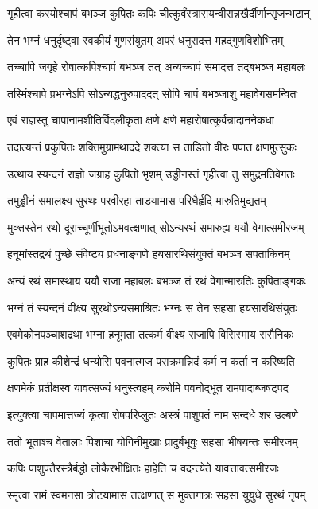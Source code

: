 \twolineshloka
{गृहीत्वा करयोश्चापं बभञ्ज कुपितः कपिः}
{चीत्कुर्वंस्त्रासयन्वीरान्नखैर्दीर्णान्सृजन्भटान्}%

\twolineshloka
{तेन भग्नं धनुर्दृष्ट्वा स्वकीयं गुणसंयुतम्}
{अपरं धनुरादत्त महद्गुणविशोभितम्}%

\twolineshloka
{तच्चापि जगृहे रोषात्कपिश्चापं बभञ्ज तत्}
{अन्यच्चापं समादत्त तद्बभञ्ज महाबलः}%

\twolineshloka
{तस्मिंश्चापे प्रभग्नेऽपि सोऽन्यद्धनुरुपाददत्}
{सोपि चापं बभञ्जाशु महावेगसमन्वितः}%

\twolineshloka
{एवं राज्ञस्तु चापानामशीतिर्विदलीकृता}
{क्षणे क्षणे महारोषात्कुर्वन्नादाननेकधा}%

\twolineshloka
{तदात्यन्तं प्रकुपितः शक्तिमुग्रामथाददे}
{शक्त्या स ताडितो वीरः पपात क्षणमुत्सुकः}%

\twolineshloka
{उत्थाय स्यन्दनं राज्ञो जग्राह कुपितो भृशम्}
{उड्डीनस्तं गृहीत्वा तु समुद्रमतिवेगतः}%

\twolineshloka
{तमुड्डीनं समालक्ष्य सुरथः परवीरहा}
{ताडयामास परिघैर्हृदि मारुतिमुद्यतम्}%

\twolineshloka
{मुक्तस्तेन रथो दूराच्चूर्णीभूतोऽभवत्क्षणात्}
{सोऽन्यरथं समारुह्य ययौ वेगात्समीरजम्}%

\twolineshloka
{हनूमांस्तद्रथं पुच्छे संवेष्ट्य प्रधनाङ्गणे}
{हयसारथिसंयुक्तं बभञ्ज सपताकिनम्}%

\twolineshloka
{अन्यं रथं समास्थाय ययौ राजा महाबलः}
{बभञ्ज तं रथं वेगान्मारुतिः कुपिताङ्गकः}%

\twolineshloka
{भग्नं तं स्यन्दनं वीक्ष्य सुरथोऽन्यसमाश्रितः}
{भग्नः स तेन सहसा हयसारथिसंयुतः}%

\twolineshloka
{एवमेकोनपञ्चाशद्रथा भग्ना हनूमता}
{तत्कर्म वीक्ष्य राजापि विसिस्माय ससैनिकः}%

\twolineshloka
{कुपितः प्राह कीशेन्द्रं धन्योसि पवनात्मज}
{पराक्रमन्निदं कर्म न कर्ता न करिष्यति}%

\twolineshloka
{क्षणमेकं प्रतीक्षस्व यावत्सज्यं धनुस्त्वहम्}
{करोमि पवनोद्भूत रामपादाब्जषट्पद}%

\twolineshloka
{इत्युक्त्वा चापमात्तज्यं कृत्वा रोषपरिप्लुतः}
{अस्त्रं पाशुपतं नाम सन्दधे शर उल्बणे}%

\twolineshloka
{ततो भूताश्च वेतालाः पिशाचा योगिनीमुखाः}
{प्रादुर्बभूवुः सहसा भीषयन्तः समीरजम्}%

\twolineshloka
{कपिः पाशुपतैरस्त्रैर्बद्धो लोकैरभीक्षितः}
{हाहेति च वदन्त्येते यावत्तावत्समीरजः}%

\twolineshloka
{स्मृत्वा रामं स्वमनसा त्रोटयामास तत्क्षणात्}
{स मुक्तगात्रः सहसा युयुधे सुरथं नृपम्}%

